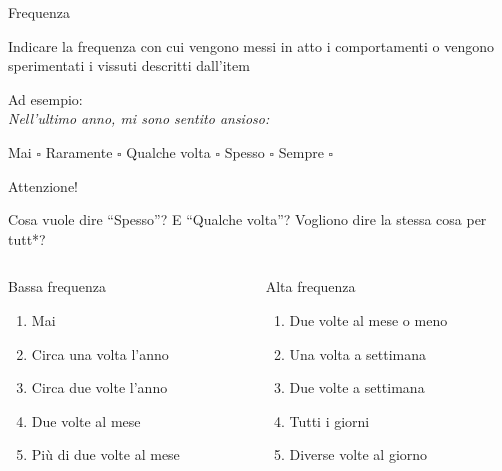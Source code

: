 \documentclass[compress]{beamer}
\begin{document}
\begin{frame}
	\small
		\begin{block}{Frequenza}
		
		Indicare la frequenza con cui vengono messi in atto i comportamenti o vengono sperimentati i vissuti descritti dall'item
		
		Ad esempio: \\
		\emph{Nell'ultimo anno, mi sono sentito ansioso:}
		\begin{center}
	Mai	$\square$ \hspace{1.5mm} Raramente $\square$ \hspace{1.5mm} Qualche volta $\square$ \hspace{1.5mm} Spesso $\square$ \hspace{1.5mm} Sempre $\square$
		\end{center}
	\end{block}
	
	\pause
	\begin{center}
		Attenzione!
	\end{center}
	
	Cosa vuole dire ``Spesso''? E ``Qualche volta''? Vogliono dire la stessa cosa per tutt*?
	
	\begin{columns}[T]
		\begin{column}{.50\linewidth}
			\begin{center}
				Bassa frequenza
			\end{center}
			\begin{enumerate}
				\item Mai 
				\item Circa una volta l'anno
				\item Circa due volte l'anno
				\item Due volte al mese 
				\item Più di due volte al mese
			\end{enumerate}
		\end{column}
		\begin{column}{.50\linewidth}
					\begin{center}
			Alta frequenza
		\end{center}
		\begin{enumerate}
			\item Due volte al mese o meno 
			\item Una volta a settimana
			\item Due volte a settimana
			\item Tutti i giorni 
			\item Diverse volte al giorno
		\end{enumerate}
		\end{column}
	\end{columns} 
\end{frame}
\end{document}
